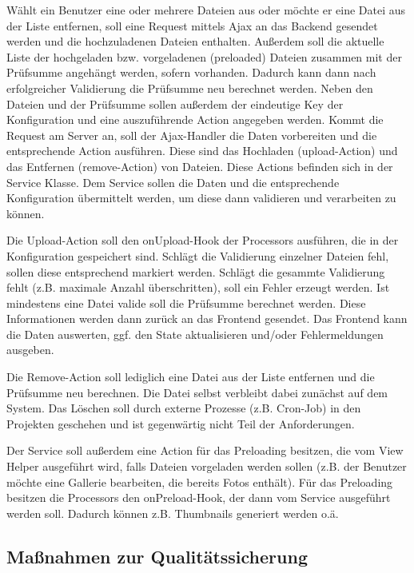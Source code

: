Wählt ein Benutzer eine oder mehrere Dateien aus oder möchte er eine Datei aus der Liste entfernen, soll eine Request mittels Ajax an das Backend gesendet werden und die hochzuladenen Dateien enthalten. Außerdem soll die aktuelle Liste der hochgeladen bzw. vorgeladenen (preloaded) Dateien zusammen mit der Prüfsumme angehängt werden, sofern vorhanden. Dadurch kann dann nach erfolgreicher Validierung die Prüfsumme neu berechnet werden. Neben den Dateien und der Prüfsumme sollen außerdem der eindeutige Key der Konfiguration und eine auszuführende Action angegeben werden. Kommt die Request am Server an, soll der Ajax-Handler die Daten vorbereiten und die entsprechende Action ausführen. Diese sind das Hochladen (upload-Action) und das Entfernen (remove-Action) von Dateien. Diese Actions befinden sich in der Service Klasse. Dem Service sollen die Daten und die entsprechende Konfiguration übermittelt werden, um diese dann validieren und verarbeiten zu können.

Die Upload-Action soll den onUpload-Hook der Processors ausführen, die in der Konfiguration gespeichert sind. Schlägt die Validierung einzelner Dateien fehl, sollen diese entsprechend markiert werden. Schlägt die gesammte Validierung fehlt (z.B. maximale Anzahl überschritten), soll ein Fehler erzeugt werden. Ist mindestens eine Datei valide soll die Prüfsumme berechnet werden. Diese Informationen werden dann zurück an das Frontend gesendet. Das Frontend kann die Daten auswerten, ggf. den State aktualisieren und/oder Fehlermeldungen ausgeben.

Die Remove-Action soll lediglich eine Datei aus der Liste entfernen und die Prüfsumme neu berechnen. Die Datei selbst verbleibt dabei zunächst auf dem System. Das Löschen soll durch externe Prozesse (z.B. Cron-Job) in den Projekten geschehen und ist gegenwärtig nicht Teil der Anforderungen.

Der Service soll außerdem eine Action für das Preloading besitzen, die vom View Helper ausgeführt wird, falls Dateien vorgeladen werden sollen (z.B. der Benutzer möchte eine Gallerie bearbeiten, die bereits Fotos enthält). Für das Preloading besitzen die Processors den onPreload-Hook, der dann vom Service ausgeführt werden soll. Dadurch können z.B. Thumbnails generiert werden o.ä.

\subsection{Maßnahmen zur Qualitätssicherung}

